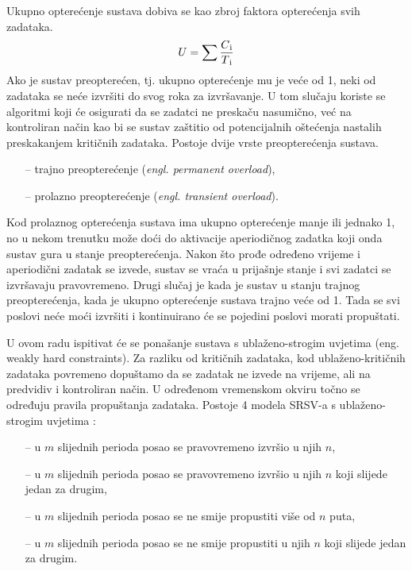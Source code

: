 \documentclass[../zavrsni.tex]{subfiles}
\begin{document}
Ukupno opterećenje sustava dobiva se kao zbroj faktora opterećenja svih zadataka. 
\begin{equation*}
    U = \sum\frac{C\textsubscript{i}}{T\textsubscript{i}}
\end{equation*}
Ako je sustav preopterećen, tj. ukupno opterećenje mu 
je veće od 1, neki od zadataka se neće izvršiti do svog roka za izvršavanje. U tom slučaju koriste se algoritmi koji će osigurati 
da se zadatci ne preskaču nasumično, već na kontroliran način kao bi se sustav zaštitio od potencijalnih oštećenja nastalih preskakanjem 
kritičnih zadataka. Postoje dvije vrste preopterećenja sustava.
\begin{itemize}
    \item[--] trajno preopterećenje (\textit{engl. permanent overload}),
    \item[--] prolazno preopterećenje (\textit{engl. transient overload}).
\end{itemize}
Kod prolaznog opterećenja sustava ima ukupno opterećenje manje ili jednako 1, no u nekom trenutku može doći do aktivacije aperiodičnog zadatka 
koji onda sustav gura u stanje preopterećenja. Nakon što prođe određeno vrijeme i aperiodični zadatak se izvede, sustav se vraća u prijašnje
stanje i svi zadatci se izvršavaju pravovremeno. Drugi slučaj je kada je sustav u stanju trajnog preopterećenja, kada je ukupno 
opterećenje sustava trajno veće od 1. Tada se svi poslovi neće moći izvršiti i kontinuirano će se pojedini poslovi morati propuštati. 


U ovom radu ispitivat će se ponašanje sustava s ublaženo-strogim uvjetima (eng. weakly hard constraints). Za razliku od 
kritičnih zadataka, kod ublaženo-kritičnih zadataka povremeno dopuštamo da se zadatak ne izvede na vrijeme, ali na predvidiv i 
kontroliran način. U određenom vremenskom okviru točno se određuju pravila propuštanja zadataka. Postoje 4 modela SRSV-a s ublaženo-strogim uvjetima :
\begin{itemize}
    \item[--] u $m$ slijednih perioda posao se pravovremeno izvršio u njih $n$,
    \item[--] u $m$ slijednih perioda posao se pravovremeno izvršio u njih $n$ koji slijede jedan za drugim,
    \item[--] u $m$ slijednih perioda posao se ne smije propustiti više od $n$ puta,
    \item[--] u $m$ slijednih perioda posao se ne smije propustiti u njih $n$ koji slijede jedan za drugim.
\end{itemize}
\end{document}
